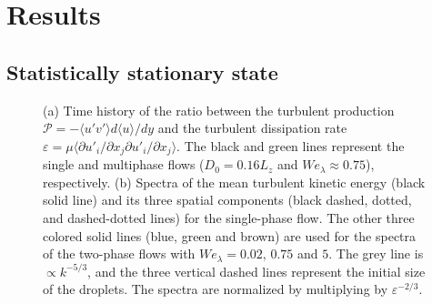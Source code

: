 \section{Results} \label{sec:result}
\subsection{Statistically stationary state}
\begin{figure}
	\centering
	 \hspace{0.5cm}
	 \vspace{0.5cm}
	\caption{(a) Time history of the ratio between the turbulent production $\mathcal{P} = - \langle u'v' \rangle d \langle u \rangle /dy$ and the turbulent dissipation rate $\varepsilon = \mu \langle \partial u'_i/\partial x_j \partial u'_i/\partial x_j \rangle$. The black and green lines represent the single and multiphase flows ($D_0=0.16L_z$ and $We_\lambda \approx 0.75$), respectively. (b) Spectra of the mean turbulent kinetic energy (black solid line) and its three spatial components (black dashed, dotted, and dashed-dotted lines) for the single-phase flow. The other three colored solid lines (blue, green and brown) are used for the spectra of the two-phase flows with $We_\lambda=0.02$, $0.75$ and $5$. The grey line is $\propto k^{-5/3}$, and the three vertical dashed lines represent the initial size of the droplets. The spectra are normalized by multiplying by $\varepsilon^{-2/3}$.}
	\label{fig:kin}
\end{figure}

